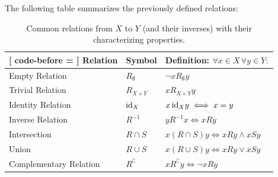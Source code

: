 The following table summarizes the previously defined relations:

\begin{table}[ht]
    \centering

    \begin{NiceTabularX}{\textwidth}{l | l | X}[
        code-before =  %
    ]
        \textbf{Relation} & \textbf{Symbol} & \textbf{Definition: } $\forall x \in X \, \forall y \in Y:$ \\\hline
        Empty Relation & $R_\emptyset$ & $\lnot x R_\emptyset y$\\
        Trivial Relation & $R_{X\times Y}$ & $x R_{X\times Y} y$\\
        Identity Relation & $\text{id}_X$ & $x\,\text{id}_X y\iff x=y$\\
        Inverse Relation & $R^{-1}$ & $y R^{-1} x\iff x R y$\\
        Intersection & $R\cap S$ & $x (R\cap S) y\iff x R y\land x S y$\\
        Union & $R\cup S$ & $x(R\cup S)y\iff x R y\lor x S y$\\
        Complementary Relation & $R^\complement$ & $x R^\complement y\iff \lnot x R y$
    \end{NiceTabularX}


%
    \caption{Common relations from $X$ to $Y$ (and their inverses) with their characterizing properties.}
\end{table}

